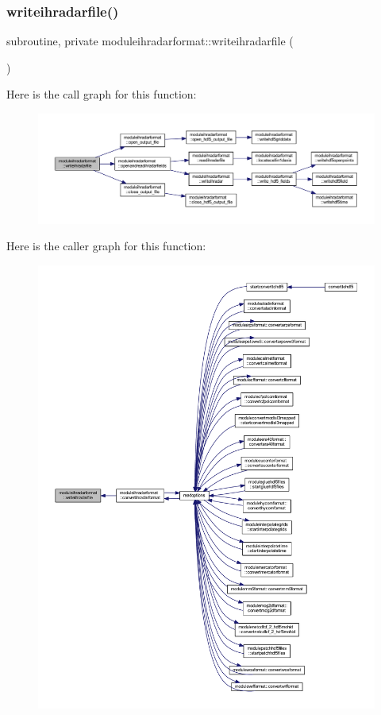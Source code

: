 \subsubsection{\texorpdfstring{writeihradarfile()}{writeihradarfile()}}
{\footnotesize\ttfamily subroutine, private moduleihradarformat\+::writeihradarfile (\begin{DoxyParamCaption}{ }\end{DoxyParamCaption})\hspace{0.3cm}{\ttfamily [private]}}

Here is the call graph for this function\+:\nopagebreak
\begin{figure}[H]
\begin{center}
\leavevmode
\includegraphics[width=350pt]{namespacemoduleihradarformat_a159e87b28314bc4e1c2d025679d954ff_cgraph}
\end{center}
\end{figure}
Here is the caller graph for this function\+:\nopagebreak
\begin{figure}[H]
\begin{center}
\leavevmode
\includegraphics[width=350pt]{namespacemoduleihradarformat_a159e87b28314bc4e1c2d025679d954ff_icgraph}
\end{center}
\end{figure}


